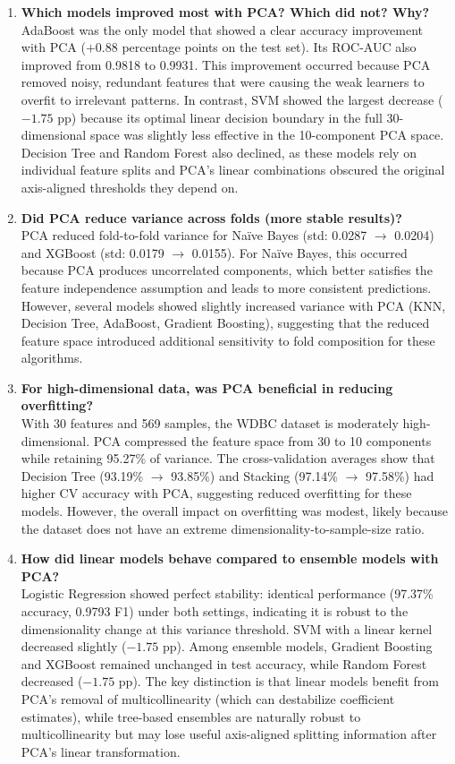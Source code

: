 \documentclass[12pt,a4paper]{article}
\begin{document}
\begin{enumerate}
    \item \textbf{Which models improved most with PCA? Which did not? Why?}\\
    AdaBoost was the only model that showed a clear accuracy improvement with PCA ($+0.88$ percentage points on the test set). Its ROC-AUC also improved from 0.9818 to 0.9931. This improvement occurred because PCA removed noisy, redundant features that were causing the weak learners to overfit to irrelevant patterns. In contrast, SVM showed the largest decrease ($-1.75$ pp) because its optimal linear decision boundary in the full 30-dimensional space was slightly less effective in the 10-component PCA space. Decision Tree and Random Forest also declined, as these models rely on individual feature splits and PCA's linear combinations obscured the original axis-aligned thresholds they depend on.

    \item \textbf{Did PCA reduce variance across folds (more stable results)?}\\
    PCA reduced fold-to-fold variance for Na\"ive Bayes (std: 0.0287 $\to$ 0.0204) and XGBoost (std: 0.0179 $\to$ 0.0155). For Na\"ive Bayes, this occurred because PCA produces uncorrelated components, which better satisfies the feature independence assumption and leads to more consistent predictions. However, several models showed slightly increased variance with PCA (KNN, Decision Tree, AdaBoost, Gradient Boosting), suggesting that the reduced feature space introduced additional sensitivity to fold composition for these algorithms.

    \item \textbf{For high-dimensional data, was PCA beneficial in reducing overfitting?}\\
    With 30 features and 569 samples, the WDBC dataset is moderately high-dimensional. PCA compressed the feature space from 30 to 10 components while retaining 95.27\% of variance. The cross-validation averages show that Decision Tree (93.19\% $\to$ 93.85\%) and Stacking (97.14\% $\to$ 97.58\%) had higher CV accuracy with PCA, suggesting reduced overfitting for these models. However, the overall impact on overfitting was modest, likely because the dataset does not have an extreme dimensionality-to-sample-size ratio.

    \item \textbf{How did linear models behave compared to ensemble models with PCA?}\\
    Logistic Regression showed perfect stability: identical performance (97.37\% accuracy, 0.9793 F1) under both settings, indicating it is robust to the dimensionality change at this variance threshold. SVM with a linear kernel decreased slightly ($-1.75$ pp). Among ensemble models, Gradient Boosting and XGBoost remained unchanged in test accuracy, while Random Forest decreased ($-1.75$ pp). The key distinction is that linear models benefit from PCA's removal of multicollinearity (which can destabilize coefficient estimates), while tree-based ensembles are naturally robust to multicollinearity but may lose useful axis-aligned splitting information after PCA's linear transformation.


\end{enumerate}
\end{document}
